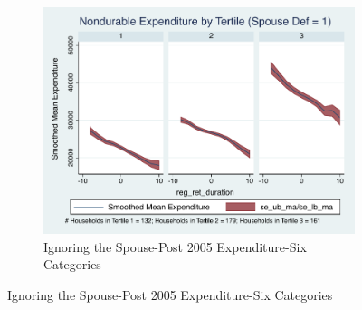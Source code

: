 \documentclass[11pt,onecolumn]{article}
\numberwithin{figure}{section}
\begin{document}
\begin{figure}
\begin{subfigure}{1.0\textwidth}
	\caption{Ignoring the Spouse-Post 2005 Expenditure-Six Categories}
	\centering
	\includegraphics[width=0.8\linewidth]{../ConsumptionPostRetirement_by_SpouseDef/Smoothed/post_2005/six_cats/spouse_def_1.pdf}
	\end{subfigure}
	\vspace{1cm}


\end{figure}
\end{document}
